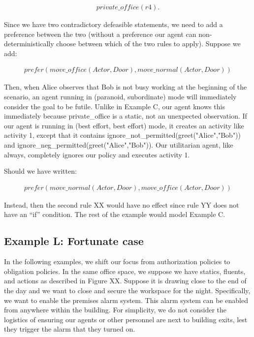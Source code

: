 \begin{equation}
\begin{split}
private\_office(r4).
\end{split}
\end{equation}

Since we have two contradictory defeasible statements, we need to add a preference between the two (without a preference our agent can non-deterministically choose between which of the two rules to apply).
Suppose we add:

\begin{equation}
\begin{split}
prefer(move\_office(Actor, Door), move\_normal(Actor, Door))
\end{split}
\end{equation}

Then, when Alice observes that Bob is not busy working at the beginning of the scenario, an agent running in (paranoid, subordinate) mode will immediately consider the goal to be futile.
Unlike in Example C, our agent knows this immediately because private\_office is a static, not an unexpected observation.
If our agent is running in (best effort, best effort) mode, it creates an activity like activity 1, except that it contains ignore\_not\_permitted(greet("Alice","Bob")) and ignore\_neg\_permitted(greet("Alice","Bob")).
Our utilitarian agent, like always, completely ignores our policy and executes activity 1.

Should we have written:

\begin{equation}
\begin{split}
prefer(move\_normal(Actor, Door), move\_office(Actor, Door))
\end{split}
\end{equation}

Instead, then the second rule XX would have no effect since rule YY does not have an “if” condition.
The rest of the example would model Example C.

\subsection{Example L: Fortunate case}

In the following examples, we shift our focus from authorization policies to obligation policies.
In the same office space, we suppose we have statics, fluents, and actions as described in Figure XX.
Suppose it is drawing close to the end of the day and we want to close and secure the workspace for the night.
Specifically, we want to enable the premises alarm system.
This alarm system can be enabled from anywhere within the building.
For simplicity, we do not consider the logistics of ensuring our agents or other personnel are next to building exits, lest they trigger the alarm that they turned on.

